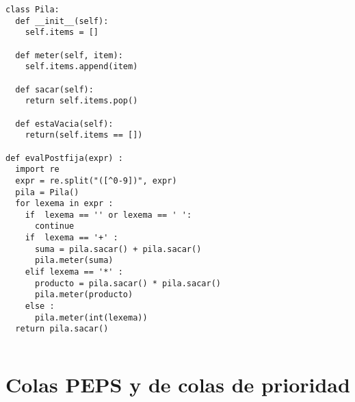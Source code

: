 \begin{verbatim}
class Pila:              
  def __init__(self):
    self.items = []

  def meter(self, item):
    self.items.append(item)

  def sacar(self):
    return self.items.pop()

  def estaVacia(self):
    return(self.items == [])

def evalPostfija(expr) :
  import re
  expr = re.split("([^0-9])", expr)
  pila = Pila()
  for lexema in expr :
    if  lexema == '' or lexema == ' ':
      continue
    if  lexema == '+' :
      suma = pila.sacar() + pila.sacar()
      pila.meter(suma)
    elif lexema == '*' :
      producto = pila.sacar() * pila.sacar()
      pila.meter(producto)
    else :
      pila.meter(int(lexema))
  return pila.sacar()
\end{verbatim}
\begin{verbatim}

\end{verbatim}

\section{Colas PEPS y de colas de prioridad}

